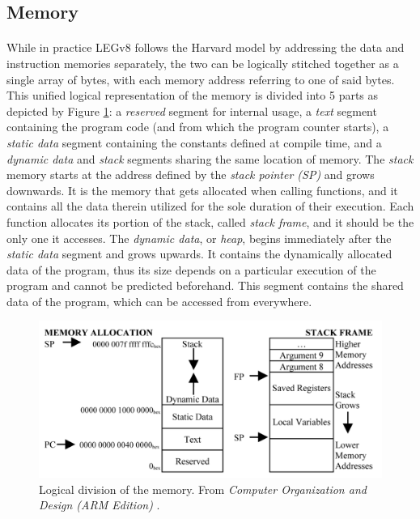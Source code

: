 \subsection{Memory}
\paragraph{}
While in practice LEGv8 follows the Harvard model by addressing the data and instruction memories separately, the two can be logically stitched together as a single array of bytes, with each memory address referring to one of said bytes. This unified logical representation of the memory is divided into 5 parts as depicted by Figure \ref{fig:legv8memdiag}: a \emph{reserved} segment for internal usage, a \emph{text} segment containing the program code (and from which the program counter starts), a \emph{static data} segment containing the constants defined at compile time, and a \emph{dynamic data} and \emph{stack} segments sharing the same location of memory. The \emph{stack} memory starts at the address defined by the \emph{stack pointer (SP)} and grows downwards. It is the memory that gets allocated when calling functions, and it contains all the data therein utilized for the sole duration of their execution. Each function allocates its portion of the stack, called \emph{stack frame}, and it should be the only one it accesses. The \emph{dynamic data}, or \emph{heap}, begins immediately after the \emph{static data} segment and grows upwards. It contains the dynamically allocated data of the program, thus its size depends on a particular execution of the program and cannot be predicted beforehand. This segment contains the shared data of the program, which can be accessed from everywhere.
\begin{figure}[H]
	\centering
	\includegraphics[width=.8\textwidth]{img/main_memory_layout.png}
	\caption{Logical division of the memory. From \emph{Computer Organization and Design (ARM Edition)} \cite{patterson2016computer}.}
 \label{fig:legv8memdiag}
\end{figure}

